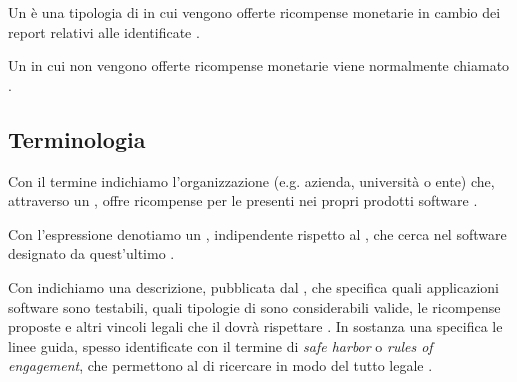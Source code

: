 \medskip

Un \BBP è una tipologia di \CVD in cui vengono offerte ricompense monetarie in cambio dei report relativi alle \vulnerability identificate \cite{walshe2023bountythesis2, walshe2022cvdpaper, akgul2020bughunters}.

\medskip

Un \CVD in cui non vengono offerte ricompense monetarie viene normalmente chiamato \VDP \cite{walshe2023bountythesis2, walshe2022cvdpaper, akgul2020bughunters}.

\subsection{Terminologia}

Con il termine \BI indichiamo l'organizzazione (e.g. azienda, università o ente) che, attraverso un \BBP, offre ricompense per le \vulnerability presenti nei propri prodotti software \cite{canidio2021verioss}.

\medskip


\medskip

Con l'espressione \BH denotiamo un \whitehathacker, indipendente rispetto al \BI, che cerca \vulnerability nel software designato da quest'ultimo \cite{canidio2021verioss}. 

\medskip

Con \bugbounty indichiamo una descrizione, pubblicata dal \BI, che specifica quali applicazioni software sono testabili, quali tipologie di \vulnerability sono considerabili valide, le ricompense proposte e altri vincoli legali che il \BH dovrà rispettare \cite{hoffman2021bountychain, hoffman2020bountychain}. In sostanza una \bugbounty specifica le linee guida, spesso identificate con il termine di \emph{safe harbor} o \emph{rules of engagement}, che permettono al \BH di ricercare \vulnerability in modo del tutto legale \cite{walshe2022cvdpaper, walshe2020bountypaper, walshe2023bountythesis3}.


